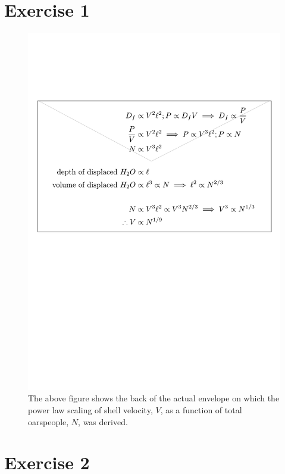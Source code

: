 \documentclass{article}
\begin{document}
\section{Exercise 1}

\begin{figure}[h!]
  \includegraphics[width=\linewidth]{Q01/powerLawEnvelope.pdf}
  \caption{The above figure shows the back of the actual envelope on which the power law scaling of shell velocity, $V$, as a function of total oarspeople, $N$, was derived.}
  \label{fig:envelope}
\end{figure}

\section{Exercise 2}
\end{document}

